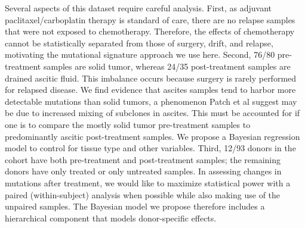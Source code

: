 Several aspects of this dataset require careful analysis. First, as adjuvant paclitaxel/carboplatin therapy is standard of care, there are no relapse samples that were not exposed to chemotherapy. Therefore, the effects of chemotherapy cannot be statistically separated from those of surgery, drift, and relapse, motivating the mutational signature approach we use here. Second, 76/80 pre-treatment samples are solid tumor, whereas 24/35 post-treatment samples are drained ascitic fluid. This imbalance occurs because surgery is rarely performed for relapsed disease. We find evidence that ascites samples tend to harbor more detectable mutations than solid tumors, a phenomenon Patch et al suggest may be due to increased mixing of subclones in ascites. This must be accounted for if one is to compare the mostly solid tumor pre-treatment samples to predominantly ascitic post-treatment samples. We propose a Bayesian regression model to control for tissue type and other variables. Third, 12/93 donors in the cohort have both pre-treatment and post-treatment samples; the remaining donors have only treated or only untreated samples. In assessing changes in mutations after treatment, we would like to maximize statistical power with a paired (within-subject) analysis when possible while also making use of the unpaired samples. The Bayesian model we propose therefore includes a hierarchical component that models donor-specific effects.
